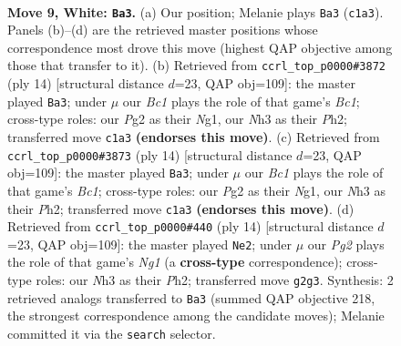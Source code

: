 \documentclass[11pt]{article}
\begin{document}
\clearpage

\begin{figure}[p]\centering
\begin{subfigure}{0.46\textwidth}\centering
\resizebox{\linewidth}{!}{%
\newchessgame
\chessboard[
  setfen={rnbq1rk1/ppp1pp1p/5bp1/8/2BPP3/2P4N/P4PPP/R1BQK2R w KQ - 5 9},
  showmover=false,
  pgfstyle=straightmove, color=movearrow, markmove={c1-a3}
]}
\caption{}
\end{subfigure}\hfill
\begin{subfigure}{0.46\textwidth}\centering
\resizebox{\linewidth}{!}{%
\newchessgame
\chessboard[
  setfen={rnbq1rk1/ppp1ppbp/6p1/8/2BPP3/2P5/P4PPP/R1BQK1NR w KQ - 3 8},
  showmover=false,
  pgfstyle=straightmove, color=movearrow, markmove={c1-a3}
]}
\caption{}
\end{subfigure}
\\[4pt]
\begin{subfigure}{0.46\textwidth}\centering
\resizebox{\linewidth}{!}{%
\newchessgame
\chessboard[
  setfen={rnbq1rk1/ppp1ppbp/6p1/8/2BPP3/2P5/P4PPP/R1BQK1NR w KQ - 3 8},
  showmover=false,
  pgfstyle=straightmove, color=movearrow, markmove={c1-a3}
]}
\caption{}
\end{subfigure}\hfill
\begin{subfigure}{0.46\textwidth}\centering
\resizebox{\linewidth}{!}{%
\newchessgame
\chessboard[
  setfen={rnbq1rk1/ppp1ppbp/6p1/8/2BPP3/2P5/P4PPP/R1BQK1NR w KQ - 3 8},
  showmover=false,
  pgfstyle=straightmove, color=movearrow, markmove={g1-e2}
]}
\caption{}
\end{subfigure}
\caption{\textbf{Move 9, White: \texttt{Ba3}.} (a) Our position; Melanie plays \texttt{Ba3} (\texttt{c1a3}). Panels (b)--(d) are the retrieved master positions whose correspondence most drove this move (highest QAP objective among those that transfer to it). (b) Retrieved from \texttt{ccrl\_top\_p0000\#3872} (ply 14) [structural distance $d$=23, QAP obj=109]: the master played \texttt{Ba3}; under $\mu$ our \emph{Bc1} plays the role of that game's \emph{Bc1}; cross-type roles: our \emph{P}g2 as their \emph{N}g1, our \emph{N}h3 as their \emph{P}h2; transferred move \texttt{c1a3} \textbf{(endorses this move)}. (c) Retrieved from \texttt{ccrl\_top\_p0000\#3873} (ply 14) [structural distance $d$=23, QAP obj=109]: the master played \texttt{Ba3}; under $\mu$ our \emph{Bc1} plays the role of that game's \emph{Bc1}; cross-type roles: our \emph{P}g2 as their \emph{N}g1, our \emph{N}h3 as their \emph{P}h2; transferred move \texttt{c1a3} \textbf{(endorses this move)}. (d) Retrieved from \texttt{ccrl\_top\_p0000\#440} (ply 14) [structural distance $d$=23, QAP obj=109]: the master played \texttt{Ne2}; under $\mu$ our \emph{Pg2} plays the role of that game's \emph{Ng1} (a \textbf{cross-type} correspondence); cross-type roles: our \emph{N}h3 as their \emph{P}h2; transferred move \texttt{g2g3}. Synthesis: 2 retrieved analogs transferred to \texttt{Ba3} (summed QAP objective 218, the strongest correspondence among the candidate moves); Melanie committed it via the \texttt{search} selector.}
\label{fig:thought-m16}
\end{figure}
\end{document}
